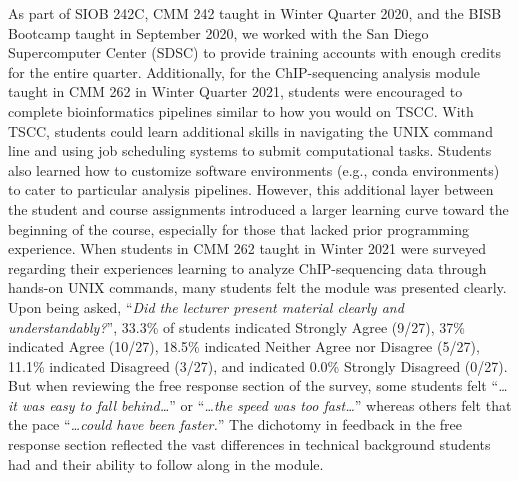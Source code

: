 As part of SIOB 242C, CMM 242 taught in Winter Quarter 2020, and the BISB Bootcamp taught in September 2020, we worked with the San Diego Supercomputer Center (SDSC) to provide training accounts with enough credits for the entire quarter. Additionally, for the ChIP-sequencing analysis module taught in CMM 262 in Winter Quarter 2021, students were encouraged to complete bioinformatics pipelines similar to how you would on TSCC. With TSCC, students could learn additional skills in navigating the UNIX command line and using job scheduling systems to submit computational tasks. Students also learned how to customize software environments (e.g., conda environments) to cater to particular analysis pipelines. However, this additional layer between the student and course assignments introduced a larger learning curve toward the beginning of the course, especially for those that lacked prior programming experience. When students in CMM 262 taught in Winter 2021 were surveyed regarding their experiences learning to analyze ChIP-sequencing data through hands-on UNIX commands, many students felt the module was presented clearly. Upon being asked, “\textit{Did the lecturer present material clearly and understandably?}”, 33.3\% of students indicated Strongly Agree (9/27), 37\% indicated Agree (10/27), 18.5\% indicated Neither Agree nor Disagree (5/27), 11.1\% indicated Disagreed (3/27), and indicated 0.0\% Strongly Disagreed (0/27). But when reviewing the free response section of the survey, some students felt “\textit{…it was easy to fall behind…}” or “\textit{…the speed was too fast…}” whereas others felt that the pace “\textit{…could have been faster.}” The dichotomy in feedback in the free response section reflected the vast differences in technical background students had and their ability to follow along in the module. 

